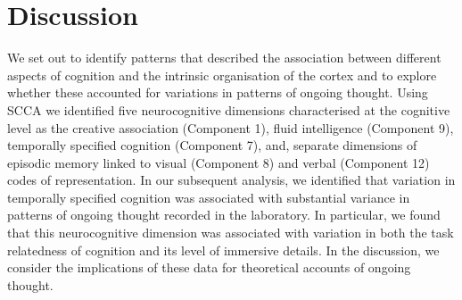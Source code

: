 \section{Discussion}
\label{study3:discussion}

We set out to identify patterns that described the association between different aspects of cognition and the intrinsic organisation of the cortex and to explore whether these accounted for variations in patterns of ongoing thought. Using SCCA we identified five neurocognitive dimensions characterised at the cognitive level as the creative association (Component 1), fluid intelligence (Component 9), temporally specified cognition (Component 7), and, separate dimensions of episodic memory linked to visual (Component 8) and verbal (Component 12) codes of representation. In our subsequent analysis, we identified that variation in temporally specified cognition was associated with substantial variance in patterns of ongoing thought recorded in the laboratory. In particular, we found that this neurocognitive dimension was associated with variation in both the task relatedness of cognition and its level of immersive details. In the discussion, we consider the implications of these data for theoretical accounts of ongoing thought.

